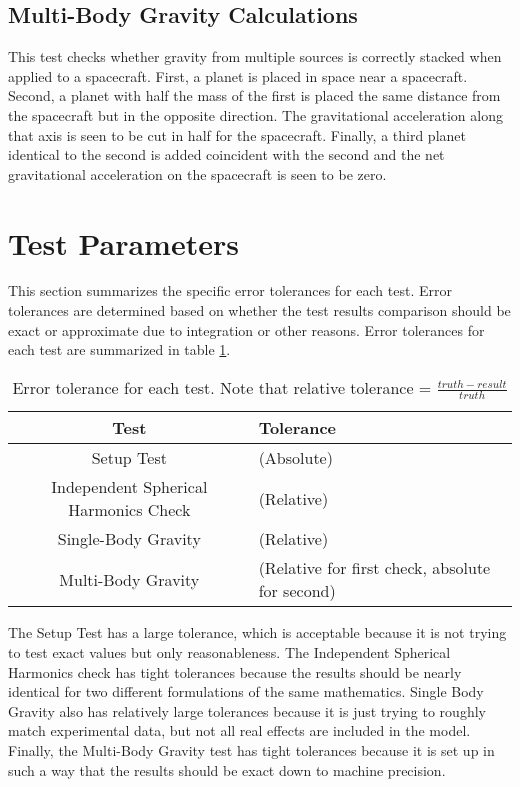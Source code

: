 \subsection{Multi-Body Gravity Calculations} This test checks whether gravity from multiple sources is correctly stacked when applied to a spacecraft. First, a planet is placed in space near a spacecraft. Second, a planet with half the mass of the first is placed the same distance from the spacecraft but in the opposite direction. The gravitational acceleration along that axis is seen to be cut in half for the spacecraft. Finally, a third planet identical to the second is added coincident with the second and the net gravitational acceleration on the spacecraft is seen to be zero. 

\section{Test Parameters}

This section summarizes the  specific error tolerances for each test. Error tolerances are determined based on whether the test results comparison should be exact or approximate due to integration or other reasons. Error tolerances for each test are summarized in table \ref{tab:errortol}. \\

\begin{table}[htbp]
	\caption{Error tolerance for each test. Note that relative tolerance = $\frac{truth - result}{truth}$}
	\label{tab:errortol}
	\centering \fontsize{10}{10}\selectfont
	\begin{tabular}{ c |  l } %
		\hline
		\textbf{Test}   							    & \textbf{Tolerance} 						  \\ \hline
		Setup Test                           			 & 	(Absolute)	   \\ 
		Independent Spherical Harmonics Check  & 	(Relative)	   \\ 
		Single-Body Gravity						   & 						(Relative)								   \\ 
		Multi-Body Gravity 						   & 	 (Relative for first check, absolute for second)		       \\ \hline
	\end{tabular}
\end{table}

The Setup Test has a large tolerance, which is acceptable because it is not trying to test exact values but only reasonableness. The Independent Spherical Harmonics check has tight tolerances because the results should be nearly identical for two different formulations of the same mathematics. Single Body Gravity also has relatively large tolerances because it is just trying to roughly match experimental data, but not all real effects are included in the model. Finally, the Multi-Body Gravity test has tight tolerances because it is set up in such a way that the results should be exact down to machine precision.

